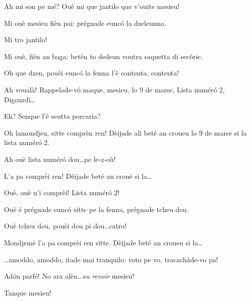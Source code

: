 \begin{drama}
\Pompiolenspeaks Ah mi son pe mé? Ouè mi que jantilo que v'ouite mesieu!

\Marcospeaks {} Mi ouè mesieu fièn pai: prégnade eunc\'o la dzeleunna.

\Pompiolenspeaks Mi tro jantilo! 

\Cimaspeaks Mi ouè, fièn an baga: betèn to dedeun  voutra saquetta di sec\^orie.


\Pompiolenspeaks Oh que dzen, pouèi eunc\'o la fenna l'è contenta, contenta!

\Cimaspeaks Ah voualà! Rappelade-v\'o maque, mesieu, lo 9 de marse, Lista num\'er\'o 2, Digourdì\ldots

\Pompiolenspeaks Eh? Senque l'è seutta porcaria?

\Cimaspeaks {} Oh lamondjeu, sitte comprèn ren!  Dèijade alì beté an croueu lo 9 de marse si la lista num\'er\'o 2.

\Pompiolenspeaks Ah ouè lista num\'er\'o dou\ldots pe le-z-où!

\Cimaspeaks {} L'a pa comprèi ren!  Dèijade beté an croué si la\ldots

\Pompiolenspeaks {} Ouè, ouè n'i comprèi! Lista num\'er\'o 2!


\Cimaspeaks Ouè é prégnade eunc\'o sitte pe la fenna, prégnade tcheu dou.

\Pompiolenspeaks{} Ouè tcheu dou, pouèi dou pi dou\ldots catro!

\Cimaspeaks {} Mondjemé l'a pa comprèi ren sitte.  Dèijade beté an croueu si la\ldots

\Pompiolenspeaks \ldots amoddo, amoddo, itade mai tranquilo: voto pe vo, tracachàde-vo pa!

\Marcospeaks Ad\'on parfé! No ara alèn\ldots \textit{au revoir} mesieu!

\Cimaspeaks Tanque mesieu!




\end{drama}
